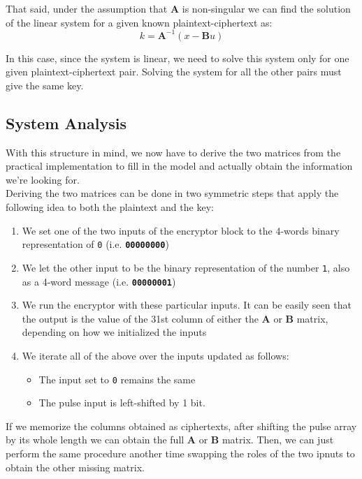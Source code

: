 \documentclass[a4paper,12pt,titlepage]{article}
\begin{document}
That said, under the assumption that $\mathbf{A}$ is non-singular we
can find the solution of the linear system for a given known
plaintext-ciphertext as:
\[k = \mathbf{A}^{-1}(x - \mathbf{B}u)\]

In this case, since the system is linear, we need to solve this system only for
one given plaintext-ciphertext pair. Solving the system for all the other pairs
must give the same key.

\subsection*{System Analysis}
With this structure in mind, we now have to derive the two matrices from the
practical implementation to fill in the model and actually obtain the
information we're looking for. \\
Deriving the two matrices can be done in two symmetric steps that apply the
following idea to both the plaintext and the key:

\begin{enumerate}
	\item We set one of the two inputs of the encryptor block to the 4-words binary
        representation of \texttt{0} (i.e. \textbf{\texttt{00000000}})
	\item We let the other input to be the binary representation of the number \texttt{1},
        also as a 4-word message (i.e. \textbf{\texttt{00000001}})
	\item We run the encryptor with these particular inputs. It can be easily seen
        that the output is the value of the 31st column of either the
        $\mathbf{A}$ or $\mathbf{B}$ matrix, depending on how we
        initialized the inputs
	\item We iterate all of the above over the inputs updated as follows:
    \begin{itemize}
      \item The input set to \texttt{0} remains the same
      \item  The pulse input is left-shifted by 1 bit.
    \end{itemize}
\end{enumerate}

If we memorize the columns obtained as ciphertexts, after shifting the pulse
array by its whole length we can obtain the full $\mathbf{A}$ or
$\mathbf{B}$ matrix. Then, we can just perform the same procedure
another time swapping the roles of the two ipnuts to obtain the other missing
matrix.
\end{document}

